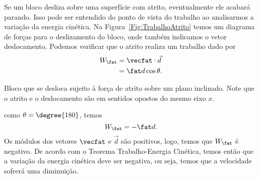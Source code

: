 
Se um bloco desliza sobre uma superfície com atrito, eventualmente ele acabará parando. Isso pode ser entendido do ponto de vista do trabalho ao analisarmos a variação da energia cinética. Na Figura~\ref{Fig:TrabalhoAtrito} temos um diagrama de forças para o deslizamento do bloco, onde também indicamos o vetor deslocamento. Podemos verificar que o atrito realiza um trabalho dado por
\begin{align}
  W_{\fat} &= \vecfat\cdot\vec{d} \\
  &= \fat d\cos\theta.
\end{align}

\begin{marginfigure}
\centering
{}
\caption{Bloco que se desloca sujeito à força de atrito sobre um plano inclinado. Note que o atrito e o deslocamento são em sentidos opostos do mesmo eixo $x$. \label{Fig:TrabalhoAtrito}}
\end{marginfigure}

\noindent{}como $\theta = \degree{180}$, temos
\begin{equation}
  W_{\fat} = -\fat d.
\end{equation}
%
Os módulos dos vetores $\vecfat$ e $\vec{d}$ são positivos, logo, temos que $W_{\fat}$ é negativo. De acordo com o Teorema Trabalho-Energia Cinética, temos então que a variação da energia cinética deve ser negativa, ou seja, temos que a velocidade sofrerá uma diminuição. 

